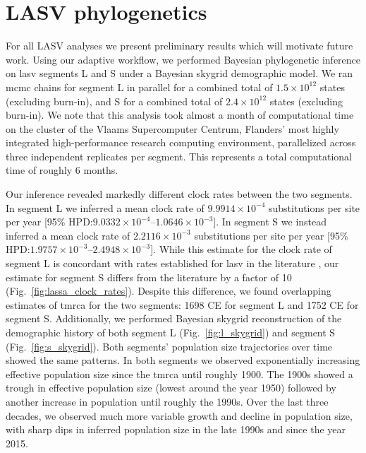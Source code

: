 \section{LASV phylogenetics}

For all LASV analyses we present preliminary results which will motivate future work.
Using our adaptive workflow, we performed Bayesian phylogenetic inference on \gls{lasv} segments L and S under a Bayesian skygrid demographic model.
We ran \gls{mcmc} chains for segment L in parallel for a combined total of $1.5\times10^{12}$ states (excluding burn-in), and S for a combined total of $2.4\times10^{12}$ states (excluding burn-in).
We note that this analysis took almost a month of computational time on the cluster of the Vlaams Supercomputer Centrum, Flanders' most highly integrated high-performance research computing environment, parallelized across three independent replicates per segment.
This represents a total computational time of roughly 6 months.

Our inference revealed markedly different clock rates between the two segments.
In segment L we inferred a mean clock rate of $9.9914\times10^{-4}$ substitutions per site per year [95\% HPD:$9.0332\times10^{-4}$--$1.0646\times10^{-3}$].
In segment S we instead inferred a mean clock rate of $2.2116\times10^{-3}$ substitutions per site per year [95\% HPD:$1.9757\times10^{-3}$--$2.4948\times10^{-3}$].
While this estimate for the clock rate of segment L is concordant with rates established for \gls{lasv} in the literature \cite{andersen2015clinical, fichet2016spatial}, our estimate for segment S differs from the literature by a factor of 10 (Fig.~\ref{fig:lassa_clock_rates}).
Despite this difference, we found overlapping estimates of \gls{tmrca} for the two segments: 1698 CE for segment L and 1752 CE for segment S.
Additionally, we performed Bayesian skygrid reconstruction of the demographic history of both segment L (Fig.~\ref{fig:l_skygrid}) and segment S (Fig.~\ref{fig:s_skygrid}).
Both segments' population size trajectories over time showed the same patterns.
In both segments we observed exponentially increasing effective population size since the \gls{tmrca} until roughly 1900.
The 1900s showed a trough in effective population size (lowest around the year 1950) followed by another increase in population until roughly the 1990s.
Over the last three decades, we observed much more variable growth and decline in population size, with sharp dips in inferred population size in the late 1990s and since the year 2015.

